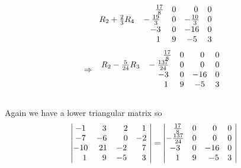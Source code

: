 \documentclass[12pt]{amsart}
\begin{document}
\begin{enumerate}
\begin{enumerate}
\begin{align}
				\begin{array}{cccc}
					\hspace{2.3cm} \text{ } \text{ } \frac{17}{8} &0 & \text{ } \text{ }\text{ }0 &0 \\
					R_2+\frac{2}{3}R_4 \hspace{0.3cm} -\frac{19}{3} &0 &-\frac{10}{3} &0 \\
					\hspace{2.2cm} -3 &0 &-16 &0 \\
					\hspace{2.2cm} \text{ } \text{ }1 &9 &-5 &3
				\end{array} \notag
			\end{align}
			\begin{align}
				\Rightarrow
				\begin{array}{cccc}
					\hspace{2.5cm} \text{ } \text{ } \frac{17}{8} &0 &\text{ } \text{ }0 &0 \\
					R_2-\frac{5}{24}R_3 \hspace{0.3cm} -\frac{137}{24} &0 &\text{ } \text{ }0 &0 \\
					\hspace{2.4cm} -3 &0 &-16 &0 \\
					\hspace{2.4cm} \text{ } \text{ }1 &9 &-5 &3
				\end{array} \notag
			\end{align}
			\\
			Again we have a lower triangular matrix so 
			\begin{align}
				\begin{vmatrix}
					-1 &\text{ } \text{ }3 &\text{ } \text{ } \text{ }2 &\text{ } \text{ }1 \text{ } \\
					-7 &-6 &\text{ } \text{ } \text{ }0 &-2 \text{ } \\
					-10 &\text{ }21 &-2 &\text{ } \text{ }7 \text{ } \\
					\text{ } \text{ } \text{ }1 &\text{ } \text{ }9 &-5 &\text{ } \text{ }3 \text{ }
				\end{vmatrix}=
				\begin{vmatrix}
					\text{ } \text{ } \frac{17}{8} &0 &\text{ } \text{ }0 &0 \text{ } \\
					-\frac{137}{24} &0 &\text{ } \text{ }0 &0 \text{ } \\
					-3 &0 &-16 &0 \text{ } \\
					\text{ } \text{ }1 &9 &\hspace{0.15cm}-5 &3 \text{ }

\end{vmatrix}
\end{align}
\end{enumerate}
\end{enumerate}
\end{document}
